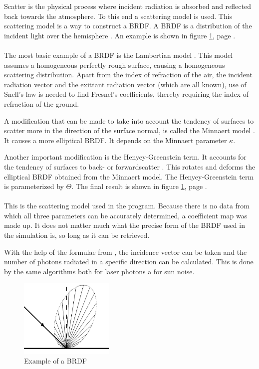 Scatter is the physical process where incident radiation is absorbed and reflected back towards the atmosphere. To this end a scattering model is used. This scattering model is a way to construct a \ac{BRDF}. A \ac{BRDF} is a distribution of the incident light over the hemisphere \cite[pages 47-49]{rees}. An example is shown in figure \ref{fig:scatter}, page \pageref{fig:scatter}.\\\\
The most basic example of a \ac{BRDF} is the Lambertian model \cite[pages 49-50]{rees}. This model assumes a homogeneous perfectly rough surface, causing a homogeneous scattering distribution. Apart from the index of refraction of the air, the incident radiation vector and the exittant radiation vector (which are all known), use of Snell's law is needed to find Fresnel's coefficients, thereby requiring the index of refraction of the ground.

A modification that can be made to take into account the tendency of surfaces to scatter more in the direction of the surface normal, is called the Minnaert model \cite[page 50]{rees}. It causes a more elliptical \ac{BRDF}. It depends on the Minnaert parameter $\kappa$.

Another important modification is the Henyey-Greenstein term. It accounts for the tendency of surfaces to back- or forwardscatter \cite[page 51]{rees}. This rotates and deforms the elliptical \ac{BRDF} obtained from the Minnaert model. The Henyey-Greenstein term is parameterized by $\Theta$. The final result is shown in figure \ref{fig:scatter}, page \pageref{fig:scatter}.\\\\
This is the scattering model used in the program. Because there is no data from which all three parameters can be accurately determined, a coefficient map was made up. It does not matter much what the precise form of the \ac{BRDF} used in the simulation is, so long as it can be retrieved.

With the help of the formulae from \cite[pages 43-51]{rees}, the incidence vector can be taken and the number of photons radiated in a specific direction can be calculated. This is done by the same algorithms both for laser photons a for sun noise.

\begin{figure}[ht!]
\centering
\includegraphics[width=0.4\textwidth]{chapters/img/scatter.png}
\caption{Example of a \ac{BRDF}}
\label{fig:scatter}
\end{figure}

